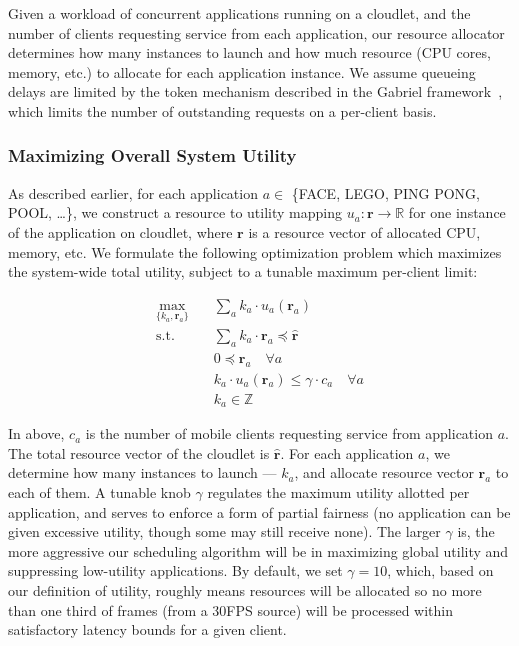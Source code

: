 Given a workload of concurrent applications running on a cloudlet, and
the number of clients requesting service from each application, our
resource allocator determines how many instances to launch and how
much resource (CPU cores, memory, etc.) to allocate for each
application instance.  We assume queueing delays are limited by the
token mechanism described in the Gabriel framework~\cite{Ha2014},
which limits the number of outstanding requests on a per-client basis.


\subsubsection{Maximizing Overall System Utility}

As described earlier, for each application $a \in $ \{FACE, LEGO, PING PONG, POOL, \ldots \}, 
we construct a resource to utility mapping
$u_a: \mathbf{r} \rightarrow \mathbb{R}$ for one instance of the application on cloudlet, 
where $\mathbf{r}$ is a resource vector of allocated CPU, memory, etc. We formulate the 
following optimization problem which maximizes the system-wide total utility,
subject to a tunable maximum per-client limit:

\begin{equation}
  \begin{aligned}
  \max_{\{k_a, \mathbf{r}_a\}} \quad & \sum_a{k_a \cdot u_a(\mathbf{r}_a)} \\
  \textrm{s.t.} \quad & \sum_a k_a \cdot \mathbf{r}_a \preccurlyeq \hat{\mathbf{r}} \\
      & 0 \preccurlyeq \mathbf{r}_a  \quad \forall a \\
      & k_a \cdot u_a(\mathbf{r}_a) \le \gamma \cdot c_a \quad \forall a \\
      & k_a \in \mathbb{Z}
  \end{aligned}
  \end{equation}

In above, $c_a$ is the number of mobile clients requesting service from application $a$.
The total resource vector of the cloudlet is  $\hat{\mathbf{r}}$. 
 For each application $a$, we determine how many instances to launch --- $k_a$, and 
allocate resource vector $\mathbf{r}_a$ to each of them.
A tunable knob $\gamma$ regulates the maximum utility allotted 
per application, and serves to enforce a form of partial fairness (no application
can be given excessive utility, though some may still receive none). 
The larger $\gamma$ is, the more aggressive our scheduling algorithm
will be in maximizing global utility and
suppressing low-utility applications. 
By default, we set $\gamma=10$, which, based on our definition of
utility, roughly means resources will be allocated so 
no more than one third of frames (from a 30FPS source) 
will be processed within satisfactory latency bounds for a given
client.

